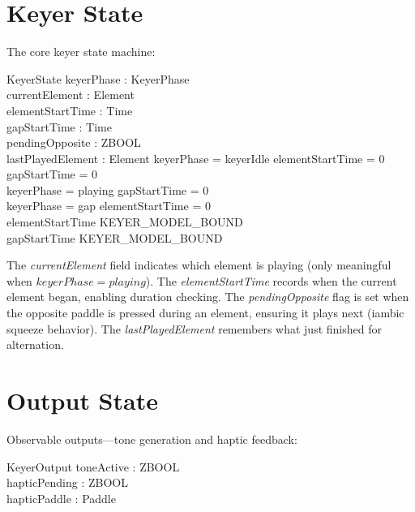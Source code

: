 \documentclass[a4paper,10pt,fleqn]{article}
\begin{document}
\section{Keyer State}

The core keyer state machine:

\begin{schema}{KeyerState}
keyerPhase : KeyerPhase \\
currentElement : Element \\
elementStartTime : Time \\
gapStartTime : Time \\
pendingOpposite : ZBOOL \\
lastPlayedElement : Element
\where
keyerPhase = keyerIdle \implies elementStartTime = 0 \land gapStartTime = 0 \\
keyerPhase = playing \implies gapStartTime = 0 \\
keyerPhase = gap \implies elementStartTime = 0 \\
elementStartTime \leq KEYER\_MODEL\_BOUND \\
gapStartTime \leq KEYER\_MODEL\_BOUND
\end{schema}

The \emph{currentElement} field indicates which element is playing (only
meaningful when $keyerPhase = playing$). The \emph{elementStartTime} records
when the current element began, enabling duration checking. The
\emph{pendingOpposite} flag is set when the opposite paddle is pressed
during an element, ensuring it plays next (iambic squeeze behavior).
The \emph{lastPlayedElement} remembers what just finished for alternation.

\section{Output State}

Observable outputs---tone generation and haptic feedback:

\begin{schema}{KeyerOutput}
toneActive : ZBOOL \\
hapticPending : ZBOOL \\
hapticPaddle : Paddle
\end{schema}
\end{document}
